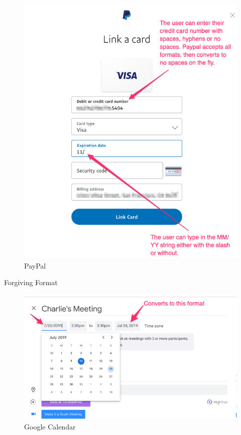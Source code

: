 \documentclass{beamer}
\begin{document}
\begin{frame}[t]
	\begin{figure}[h]
		\centering
		\includegraphics[scale=0.4]{images/lec08-pic33.png}
		\caption{PayPal}
	\end{figure}
\end{frame}

\begin{frame}[t]{Forgiving Format}
	\begin{figure}[h]
		\centering
		\includegraphics[scale=0.5]{images/lec08-pic34.png}
		\caption{Google Calendar}
	\end{figure}
\end{frame}
\end{document}
